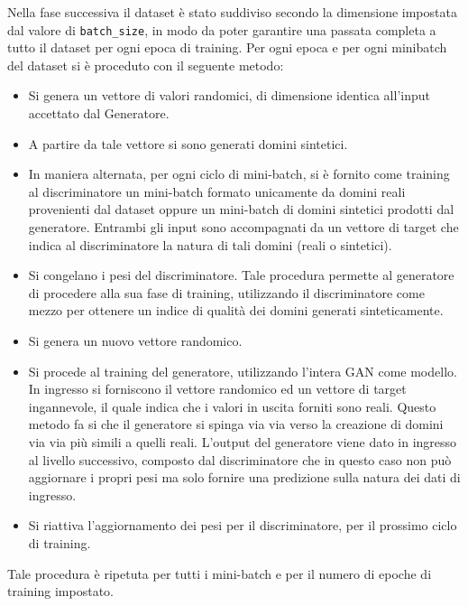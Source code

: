 Nella fase successiva il dataset è stato suddiviso secondo la dimensione impostata dal valore di \lstinline!batch_size!, in modo da poter garantire una passata completa a tutto il dataset per ogni epoca di training.
Per ogni epoca e per ogni minibatch del dataset si è proceduto con il seguente metodo: 
\begin{itemize}
	\item Si genera un vettore di valori randomici, di dimensione identica all'input accettato dal Generatore. 
	\item A partire da tale vettore si sono generati domini sintetici.
	\item In maniera alternata, per ogni ciclo di mini-batch, si è fornito come training al discriminatore un mini-batch formato unicamente da domini reali provenienti dal dataset oppure un mini-batch di domini sintetici prodotti dal generatore. Entrambi gli input sono accompagnati da un vettore di target che indica al discriminatore la natura di tali domini (reali o sintetici).
	\item Si congelano i pesi del discriminatore. Tale procedura permette al generatore di procedere alla sua fase di training, utilizzando il discriminatore come mezzo per ottenere un indice di qualità dei domini generati sinteticamente.
	\item Si genera un nuovo vettore randomico.
	\item Si procede al training del generatore, utilizzando l'intera GAN come modello. In ingresso si forniscono il vettore randomico ed un vettore di target ingannevole, il quale indica che i valori in uscita forniti sono reali. Questo metodo fa si che il generatore si spinga via via verso la creazione di domini via via più simili a quelli reali. L'output del generatore viene dato in ingresso al livello successivo, composto dal discriminatore che in questo caso non può aggiornare i propri pesi ma solo fornire una predizione sulla natura dei dati di ingresso. 
	\item Si riattiva l'aggiornamento dei pesi per il discriminatore, per il prossimo ciclo di training.
\end{itemize}

Tale procedura è ripetuta per tutti i mini-batch e per il numero di epoche di training impostato. 